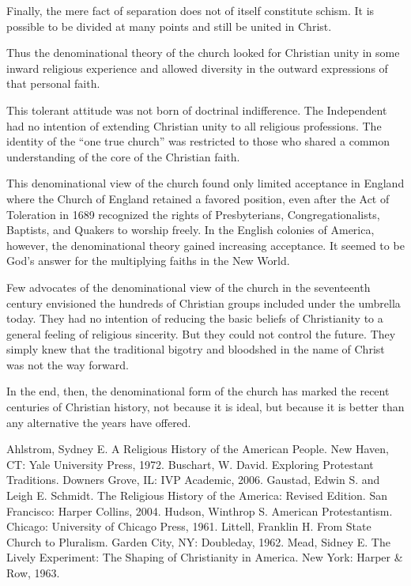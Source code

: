 Finally, the mere fact of separation does not of itself constitute schism. It is possible to be
divided at many points and still be united in Christ.

Thus the denominational theory of the church looked for Christian unity in some inward religious
experience and allowed diversity in the outward expressions of that personal faith.

This tolerant attitude was not born of doctrinal indifference. The Independent had no intention of
extending Christian unity to all religious professions. The identity of the “one true church” was
restricted to those who shared a common understanding of the core of the Christian faith.

This denominational view of the church found only limited acceptance in England where the Church of
England retained a favored position, even after the Act of Toleration in 1689 recognized the rights
of Presbyterians, Congregationalists, Baptists, and Quakers to worship freely. In the English
colonies of America, however, the denominational theory gained increasing acceptance. It seemed to
be God’s answer for the multiplying faiths in the New World.

Few advocates of the denominational view of the church in the seventeenth century envisioned the
hundreds of Christian groups included under the umbrella today. They had no intention of reducing
the basic beliefs of Christianity to a general feeling of religious sincerity. But they could not
control the future. They simply knew that the traditional bigotry and bloodshed in the name of
Christ was not the way forward.

In the end, then, the denominational form of the church has marked the recent centuries of Christian
history, not because it is ideal, but because it is better than any alternative the years have
offered.

\begin{readinglist}
\entry Ahlstrom, Sydney E. A Religious History of the American People. New Haven, CT: Yale
  University Press, 1972.
\entry Buschart, W. David. Exploring Protestant Traditions. Downers Grove, IL: IVP Academic, 2006.
\entry *Gaustad, Edwin S. and Leigh E. Schmidt. The Religious History of the America: Revised
  Edition. San Francisco: Harper Collins, 2004.
\entry Hudson, Winthrop S. American Protestantism. Chicago: University of Chicago Press, 1961.
\entry Littell, Franklin H. From State Church to Pluralism. Garden City, NY: Doubleday, 1962.
\entry Mead, Sidney E. The Lively Experiment: The Shaping of Christianity in America. New York:
  Harper \& Row, 1963.
\end{readinglist}
